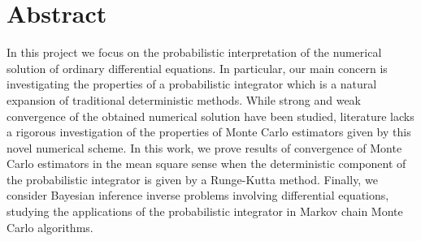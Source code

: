 \section*{Abstract}

In this project we focus on the probabilistic interpretation of the numerical solution of ordinary differential equations. In particular, our main concern is investigating the properties of a probabilistic integrator which is a natural expansion of traditional deterministic methods. While strong and weak convergence of the obtained numerical solution have been studied, literature lacks a rigorous investigation of the properties of Monte Carlo estimators given by this novel numerical scheme. In this work, we prove results of convergence of Monte Carlo estimators in the mean square sense when the deterministic component of the probabilistic integrator is given by a Runge-Kutta method. Finally, we consider Bayesian inference inverse problems involving differential equations, studying the applications of the probabilistic integrator in Markov chain Monte Carlo algorithms.
	
	
	
	
	
	
